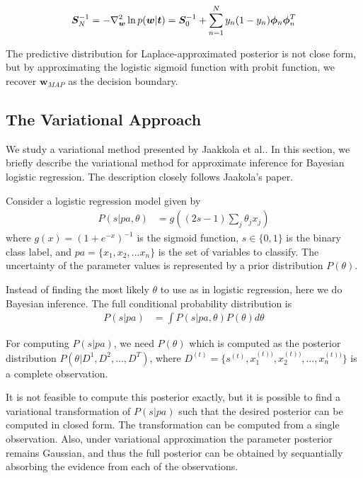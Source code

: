 \begin{equation}
\bm{S}_N^{-1} = -\nabla^2_{\bm{w}} \ln p(\bm{w}|\bm{t})
= \bm{S}_0^{-1} + \sum_{n=1}^N y_n(1-y_n) \bm{\phi}_n \bm{\phi}_n^T
\end{equation}

The predictive distribution for Laplace-approximated posterior is not close
form, but by approximating the logistic sigmoid function with probit function,
we recover $\bm{w}_{MAP}$ as the decision boundary.

\subsection{The Variational Approach}
We study a variational method presented by Jaakkola et al.\cite{Jaakkola96avariational}. In this section, we briefly describe the variational method for approximate inference for Bayesian logistic regression. The description closely follows Jaakola's paper.

Consider a logistic regression model given by 
\begin{align}
  P(s|pa, \theta) &= g((2s - 1)\sum_j\theta_jx_j)
\end{align}
where $g(x) = (1 + e^{-x})^{-1}$ is the sigmoid function, $s \in \{0, 1\}$ is the binary class label, and $pa = \{x_1, x_2, ... x_n\}$ is the set of variables to classify. The uncertainty of the parameter values is represented by a prior distribution $P(\theta)$.

Instead of finding the most likely $\theta$ to use as in logistic regression, here we do Bayesian inference. The full conditional probability distribution is
\begin{align}
P(s|pa) &= \int P(s|pa, \theta)P(\theta)d\theta
\end{align}

For computing $P(s|pa)$, we need $P(\theta)$ which is computed as the posterior distribution $P(\theta| D^1, D^2, ..., D^T)$, where $D^{(t)} = \{s^{(t)}, x^{(t))}_1, x^{(t))}_2, ..., x^{(t))}_n\}$ is a complete observation. 

It is not feasible to compute this posterior exactly, but it is possible to find a variational transformation of $P(s|pa)$ such that the desired posterior can be computed in closed form. The transformation can be computed from a single observation. Also, under variational approximation the parameter posterior remains Gaussian, and thus the full posterior can be obtained by sequantially absorbing the evidence from each of the observations.

